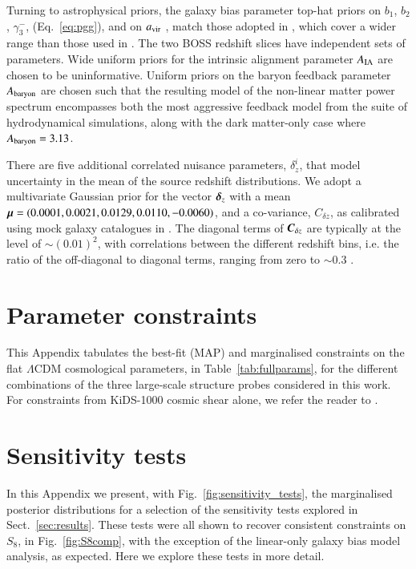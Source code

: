 \begin{appendix}
Turning to astrophysical priors, the galaxy bias parameter top-hat priors on $b_1$, $b_2$,  $\gamma_3^-$, (Eq.~\ref{eq:pgg}), and on $a_{\rm vir}$ \citep[see the `fingers of god' model in equations 6 to 9 of][]{joachimi/etal:inprep},
match those adopted in \citet{troester/etal:2020}, which cover a wider range than those used in \citet{sanchez/etal:2017}.  
The two BOSS redshift slices have independent sets of parameters.   
Wide uniform priors for the intrinsic alignment parameter $A_{\rm IA}$ are chosen to be uninformative.    
Uniform priors on the baryon feedback parameter $A_{\rm baryon}$ are chosen such that the resulting \citet{mead/etal:2015} model of the non-linear matter power spectrum encompasses both the most aggressive feedback model from the \citet{vandaalen/etal:2011} suite of hydrodynamical simulations, along with the dark matter-only case where $A_{\rm baryon}=3.13$.

There are five additional correlated nuisance parameters, $\delta^i_z$, that model uncertainty in the mean of the source redshift distributions.  We adopt a multivariate Gaussian prior for the vector $\mbox{\boldmath $\delta$}_z$ with a mean $\mbox{\boldmath $\mu$} = (0.0001,0.0021,0.0129,0.0110,-0.0060)$, and a co-variance, $C_{\delta z}$, as calibrated using mock galaxy catalogues in \citet{wright/etal:2020}.   
The diagonal terms of $\mbox{\boldmath $C$}_{\delta z}$ are typically at the level of $\sim(0.01)^2$, with correlations between the different redshift bins, i.e. the ratio of the off-diagonal to diagonal terms,  ranging from zero to $\sim 0.3$ \citep[see section 3 and figure 2 of][for details]{hildebrandt/etal:inprep}.


\section{Parameter constraints}
\label{app:parameter-constraints}
This Appendix tabulates the best-fit (MAP) and marginalised constraints on the flat $\Lambda$CDM cosmological parameters, in Table~\ref{tab:fullparams}, for the different combinations of the three large-scale structure probes considered in this work.   For constraints from KiDS-1000 cosmic shear alone, we refer the reader to \citet{asgari/etal:inprep}.


\section{Sensitivity tests}
\label{app:sensitivity}
In this Appendix we present, with Fig.~\ref{fig:sensitivity_tests}, the marginalised posterior distributions for a selection of the \tttp sensitivity tests explored in Sect.~\ref{sec:results}.  
These tests were all shown to recover consistent constraints on $S_8$, in Fig.~\ref{fig:S8comp}, with the exception of the linear-only galaxy bias model analysis, as expected.    
Here we explore these tests in more detail.    


\end{appendix}
